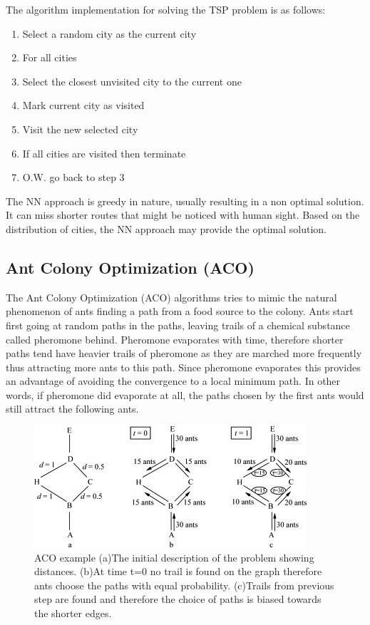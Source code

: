 \documentclass[twocolumn]{article}
\begin{document}
	The algorithm implementation for solving the TSP problem is as follows:
	\begin{enumerate}
		\item Select a random city as the current city
		\item For all cities
		\item Select the closest unvisited city to the current one
		\item Mark current city as visited
		\item Visit the new selected city
		\item If all cities are visited then terminate
		\item O.W. go back to step 3
	\end{enumerate}
	
	The NN approach is greedy in nature, usually resulting in a non optimal solution. It can miss shorter routes that might be noticed with human sight. Based on the distribution of cities, the NN approach may provide the optimal solution.
	
	\subsection{Ant Colony Optimization (ACO)}
	The Ant Colony Optimization (ACO) algorithms tries to mimic the natural phenomenon of ants finding a path from a food source to the colony. Ants start first going at random paths in the paths, leaving trails of a chemical substance called pheromone behind. Pheromone evaporates with time, therefore shorter paths tend have heavier trails of pheromone as they are marched more frequently thus attracting more ants to this path. Since pheromone evaporates this provides an advantage of avoiding the convergence to a local minimum path. In other words, if pheromone did evaporate at all, the paths chosen by the first ants would still attract the following ants.
	
	\begin{figure}[h!]
		\centering
		\includegraphics[scale=0.8]{./ACOexample.jpg}
		\caption{ACO example\cite{ACOExample} (a)The initial description of the problem showing distances. (b)At time t=0 no trail is found on the graph therefore ants choose the paths with equal probability. (c)Trails from previous step are found and therefore the choice of paths is biased towards the shorter edges.}
		\label{fig:ACOexample}
	\end{figure}
	
\end{document}

